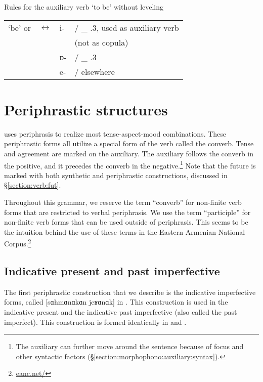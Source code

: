 \begin{newruleblock}
	{Rules for the auxiliary verb `to be' without leveling}%
	
	\begin{center}
		\begin{tabular}{llll}
			`be' or {\auxgloss} & $\leftrightarrow$ & {i-} &/ {\neggloss} \_ {\prs}.3{\sg}, used as auxiliary verb \\
			& & &  \hphantom{/} (not as copula)\\
			& & {ɒ-} &/ \_ {\prs}.3{\sg} \\
			& & {e-} &/ elsewhere
		\end{tabular}
	\end{center}
	
\end{newruleblock}






\section{Periphrastic structures}\label{section:verb:periphrasis}
{\iaIA} uses periphrasis     to realize most tense-aspect-mood combinations. These periphrastic forms all utilize a special form of the verb called the converb. Tense and agreement are marked on the auxiliary. The auxiliary follows the converb in the positive, and it precedes the converb in the negative.\footnote{ The auxiliary can further move around the sentence because of focus and other syntactic factors (\S\ref{section:morphophono:auxiliary:syntax}).} Note that the future is marked with both synthetic and periphrastic constructions, discussed in \S\ref{section:verb:fut}. 

Throughout this grammar, we reserve the term “converb” for non-finite verb forms that are restricted to verbal periphrasis. We use the term “participle” for non-finite verb forms that can be used outside of periphrasis. This seems to be the intuition behind the use of these terms in the Eastern Armenian National Corpus.\footnote{\url{eanc.net/}}


\subsection{Indicative present and past imperfective}\label{section:verb:periphrasis:indicative}\largerpage
The first periphrastic construction that we describe is the indicative imperfective forms, called [sɑhmɑnɑkɑn jeʁɑnɑk]  in {\seaSEA}. This construction is used in the indicative present and the indicative past imperfective (also called the past imperfect). This construction is formed identically in {\seaSE} and {\iaIA}. 

